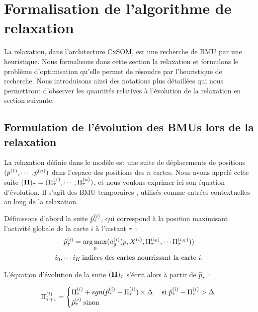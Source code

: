 \documentclass[../main]{subfiles}
\begin{document}
\section{Formalisation de l'algorithme de relaxation}

La relaxation, dans l'architecture CxSOM, est une recherche de BMU par une heuristique.
Nous formalisons dans cette section la relaxation et formulons le problème d'optimisation qu'elle permet de résoudre par l'heuristique de recherche.
Nous introduisons ainsi des notations plus détaillées qui nous permettront d'observer les quantités relatives à l'évolution de la relaxation en section suivante.

\subsection{Formulation de l'évolution des BMUs lors de la relaxation}\label{sec:formulation_suite}

La relaxation définie dans le modèle est une suite de déplacements de positions $(p^{({1})},\cdots, p^{({n})})$ dans l'espace des positions des $n$ cartes.
Nous avons appelé cette suite $(\mathbf{\Pi})_\tau = (\Pi^{({1})}_\tau,\cdots,\Pi^{({n})}_\tau)$, et nous voulons exprimer ici son équation d'évolution. Il s'agit des \og BMU temporaires \fg{}, utilisés comme entrées contextuelles au long de la relaxation.

Définissons d'abord la suite $\hat{p}^{({i})}_\tau$, qui correspond à la position maximisant l'activité globale de la carte $i$ à l'instant $\tau$~:
\begin{equation}
\begin{gathered}
\hat{p}^{({i})}_{\tau} = \operatorname*{arg\,max}_p(a_g^{({i})}(p, X^{({i})}, \Pi^{({i_0})}_\tau, \cdots \Pi^{({i_K})}_\tau))\\
 i_0, \cdots i_K \: \text{indices des cartes nourrissant la carte $i$}.
\end{gathered}
\label{eq:pstar}
\end{equation}

L'équation d'évolution de la suite $(\mathbf{\Pi})_\tau$ s'écrit alors à partir de $\hat{p}_\tau$~:

\begin{equation}
\Pi^{({i})}_{\tau+1} = 
\begin{cases}
\Pi^{({i})}_{\tau} + sgn(\hat{p}^{({i})}_{\tau} - \Pi^{({i})}_{\tau}) \times \Delta \; & \text{si $\hat{p}^{({i})}_{\tau} - \Pi^{({i})}_{\tau} > \Delta$ } \\
\hat{p}^{({i})}_{\tau} \; \text{sinon}	
\end{cases}
\label{eq:evolution}
\end{equation}
\end{document}

